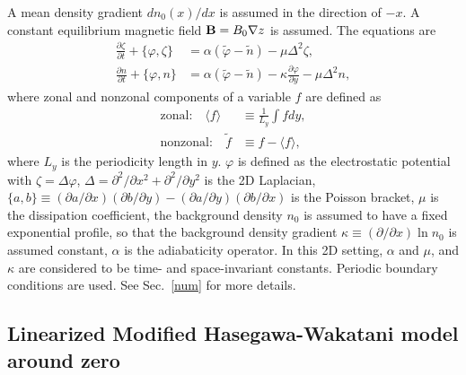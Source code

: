 \documentclass[12pt,lot, lof]{puthesis}
\begin{document}
A mean density gradient $d n_0 (x) /dx$ is assumed in the direction of $ -x$. A constant equilibrium magnetic field ${\bf B} = B_0 \nabla z$ is assumed. The equations are
%
\begin{subequations}
\label{MHWs}
\begin{align}
	\frac{\partial \zeta}{\partial t}  + \{\varphi , \zeta \} &= \alpha (\tilde{\varphi}-\tilde{n}) - \mu \Delta^2 \zeta \label{MHWeqs1}	, \\	
	\frac{\partial n}{\partial t}  + \{\varphi , n\} &=  \alpha (\tilde{\varphi}-\tilde{n}) -\kappa \frac{\partial \varphi}{\partial y}- \mu \Delta^2 n,
\label{MHWeqs2}	
\end{align}
\end{subequations}
%
where zonal and nonzonal components of a variable $f$ are defined as
%
\begin{subequations}
\begin{align}
\mbox{zonal:} \quad  \langle f  \rangle &\equiv \frac{1}{L_y} \int fdy, \\
 \mbox{nonzonal:} \quad   \tilde{f}  &\equiv f - \langle f  \rangle,
\end{align}
\end{subequations}
where $L_y$ is the periodicity length in $y$. $\varphi$ is defined as the electrostatic potential with $\zeta = \Delta \varphi$, $\Delta = \partial ^2 / \partial x^2+ \partial ^2 / \partial y^2$ is the 2D Laplacian, $\{a,b\} \equiv  \left( \partial a /\partial x  \right)\left( \partial b /\partial y \right)  -\left( \partial a /\partial y  \right)\left( \partial b /\partial x \right) $ is the Poisson bracket, $\mu$ is the dissipation coefficient, the background density $n_0$ is assumed to have a fixed exponential profile, so that the background density gradient  $\kappa \equiv  \left( \partial  /\partial x \right) \ln n_0$ is assumed constant, $\alpha $ is the adiabaticity operator. In this 2D setting, $\alpha$ and $\mu$, and $\kappa$ are considered to be time- and space-invariant constants. Periodic boundary conditions are used. See Sec.~\ref{num} for more details.

\subsection{Linearized Modified Hasegawa-Wakatani model around zero}
\end{document}
